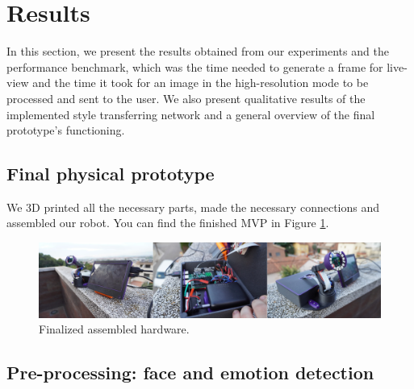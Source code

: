 \section{Results}

In this section, we present the results obtained from our experiments and the performance benchmark, which was the time needed to generate a frame for live-view and the time it took for an image in the high-resolution mode to be processed and sent to the user. We also present qualitative results of the implemented style transferring network and a general overview of the final prototype's functioning.

\subsection{Final physical prototype}

We 3D printed all the necessary parts, made the necessary connections and assembled our robot. You can find the finished MVP in Figure \ref{fig:final_luxopi}.

\begin{figure}[h]
    \centering
    \includegraphics[width = \textwidth]{resources/final_luxopi.png}
    \caption{Finalized assembled hardware.
    } \label{fig:final_luxopi}
\end{figure}

\subsection{Pre-processing: face and emotion detection}


